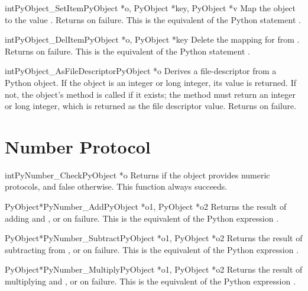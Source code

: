 \documentclass{manual}
\begin{document}
\begin{cfuncdesc}{int}{PyObject_SetItem}{PyObject *o,
                                         PyObject *key, PyObject *v}
Map the object  to the value .
Returns  on failure.  This is the equivalent
of the Python statement .
\end{cfuncdesc}


\begin{cfuncdesc}{int}{PyObject_DelItem}{PyObject *o, PyObject *key}
Delete the mapping for  from .  Returns  on
failure. This is the equivalent of the Python statement .
\end{cfuncdesc}

\begin{cfuncdesc}{int}{PyObject_AsFileDescriptor}{PyObject *o}
Derives a file-descriptor from a Python object.  If the object
is an integer or long integer, its value is returned.  If not, the
object's  method is called if it exists; the method
must return an integer or long integer, which is returned as the file
descriptor value.  Returns  on failure.
\end{cfuncdesc}


\section{Number Protocol \label{number}}

\begin{cfuncdesc}{int}{PyNumber_Check}{PyObject *o}
Returns  if the object  provides numeric protocols, and
false otherwise. 
This function always succeeds.
\end{cfuncdesc}


\begin{cfuncdesc}{PyObject*}{PyNumber_Add}{PyObject *o1, PyObject *o2}
Returns the result of adding  and , or \NULL{} on
failure.  This is the equivalent of the Python expression
.
\end{cfuncdesc}


\begin{cfuncdesc}{PyObject*}{PyNumber_Subtract}{PyObject *o1, PyObject *o2}
Returns the result of subtracting  from , or
\NULL{} on failure.  This is the equivalent of the Python expression
.
\end{cfuncdesc}


\begin{cfuncdesc}{PyObject*}{PyNumber_Multiply}{PyObject *o1, PyObject *o2}
Returns the result of multiplying  and , or \NULL{} on
failure.  This is the equivalent of the Python expression
.
\end{cfuncdesc}
\end{document}
